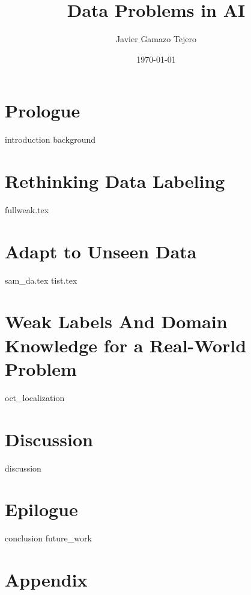 \documentclass[
    10pt,
	colorful,
	boxey,
 a4paper,
]{tufte-style-thesis}
\author{Javier Gamazo Tejero}
\title{Data Problems in AI}
\date{\today}
\begin{document}
\ifdebug
    \layout
\fi


\frontmatter
{}
\pagestyle{empty}





\tableofcontents
\listoffigures
\listoftables

\clearpage
\pagestyle{fancy}


\mainmatter
{}

\part{Prologue}
{introduction}
{background}
\part{Rethinking Data Labeling}
{fullweak.tex}
\part{Adapt to Unseen Data}
{sam_da.tex}
{tist.tex}
\part{Weak Labels And Domain Knowledge for a Real-World Problem}
{oct_localization}
\part{Discussion}
{discussion}
\part{Epilogue}
{conclusion}
{future_work}


\backmatter

\thispagestyle{empty}
\printbibliography
\cleardoublepage

\part*{Appendix}
\appendix
\end{document}
